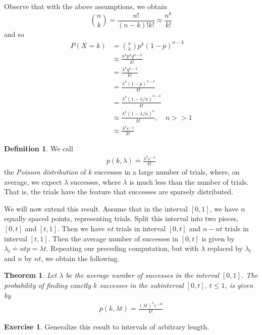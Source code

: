 \documentclass[12pt]{article}
\theoremstyle{plain}
\newtheorem{theorem}{Theorem}
\theoremstyle{definition}
\newtheorem*{definition}{Definition}
\newtheorem*{exercise}{Exercise}
\theoremstyle{remark}
\numberwithin{equation}{section}  %
\begin{document}
Observe that with the above assumptions, we obtain
\begin{equation*}
\binom{n}{k} = \frac{n!}{(n-k)! k!} \approx \frac{n^k}{k!}
\end{equation*}
and so
\begin{align*}
P(X = k)
& = \binom{n}{k} p^k (1 - p)^{n-k} \\
& \approx \frac{n^k p^k q^{n-k}}{k!} \\
& = \frac{\lambda^k q^{n-k}}{k!} \\
& = \frac{\lambda^k (1-p)^{n-k}}{k!} \\
& = \frac{\lambda^k (1-\lambda/n)^{n-k}}{k!} \\
& \approx \frac{\lambda^k (1-\lambda/n)^{n}}{k!} , \quad n >> 1\\
& \approx \frac{\lambda^k e^{-\lambda}}{k!}
\end{align*}
\begin{definition}
We call
\begin{align*}
p(k, \lambda) \doteq \frac{\lambda^k e^{-\lambda}}{k!}
\end{align*}
the \emph{Poisson distribution} of $k$ successes in a large number
of trials, where, on average, we expect $\lambda$ successes,
where $\lambda$ is much less than the number of trials.
That is, the trials have the feature that successes are
sparsely distributed.
\end{definition}
We will now extend this result. Assume that in the interval $[0,1]$,
we have $n$ equally spaced points, representing trials. Split this interval into two pieces,
$[0,t]$ and $[t, 1]$. Then we have $nt$ trials in interval $[0,t]$ and
$n - nt$ trials in interval $[t,1]$. Then the average number of successes
in $[0,t]$ is given by $\lambda_t \doteq n t p = \lambda t$. Repeating
our preceding computation, but with $\lambda$ replaced by $\lambda_t$
and $n$ by $nt$, we obtain the following.
\begin{theorem}
Let $\lambda$ be the average number of successes in the interval $[0,1]$.
The probability of finding exactly $k$ successes  in the subinterval $[0,t]$,
$t \le 1$, is given by
\begin{align*}
p(k, \lambda t) = \frac{ (\lambda t)^{k} e^{-\lambda t}}{k!}
\end{align*}
\end{theorem}
\begin{exercise}
Generalize this result to intervals of arbitrary length.
\end{exercise}
\end{document}
